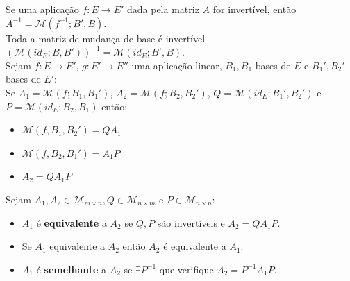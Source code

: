 \documentclass[]{report}
\begin{document}
Se uma aplicação $f: E \to E'$ dada pela matriz $A$ for invertível, então $A^{-1} = \mathcal{M}(f^{-1}; B', B)$.\\[5mm]
Toda a matriz de mudança de base é invertível $\left(\mathcal{M}(id_E; B, B')\right)^{-1} = \mathcal{M}(id_E; B', B)$.\\[5mm]
Sejam $f: E \to E'$, $g: E' \to E''$ uma aplicação linear, $B_1, B_1$ bases de $E$ e $B_1', B_2'$ bases de $E'$:\\
Se $A_1 = \mathcal{M}(f; B_1, B_1')$,  $A_2 = \mathcal{M}(f; B_2, B_2')$, $Q = \mathcal{M}(id_E; B_1', B_2')$ e  $P = \mathcal{M}(id_E; B_2, B_1)$ então:
\begin{itemize}
\item $\mathcal{M}(f, B_1, B_2') = QA_1$
\item $\mathcal{M}(f, B_2, B_1') = A_1P$
\item $A_2 = QA_1 P$
\end{itemize}
Sejam $A_1, A_2 \in \mathcal{M}_{m \times n}, Q \in \mathcal{M}_{n \times m}$ e $P \in \mathcal{M}_{n \times n}$:
\begin{itemize}
\item $A_1$ é \textbf{equivalente} a $A_2$ se $Q, P$ são invertíveis e $A_2 = QA_1P$.
\item Se $A_1$ equivalente a $A_2$ então $A_2$ é equivalente a $A_1$.
\item $A_1$ é \textbf{semelhante} a $A_2$ se $\exists P^{-1}$ que verifique $A_2 = P^{-1}A_1P$.
\end{itemize}
\end{document}
